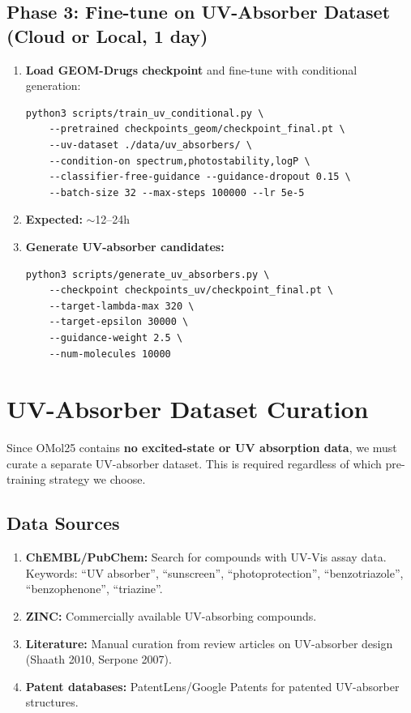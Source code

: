\documentclass[11pt,a4paper]{article}
\begin{document}
\subsection{Phase 3: Fine-tune on UV-Absorber Dataset (Cloud or Local, 1 day)}

\begin{enumerate}[nosep]
    \item \textbf{Load GEOM-Drugs checkpoint} and fine-tune with conditional generation:
\begin{verbatim}
python3 scripts/train_uv_conditional.py \
    --pretrained checkpoints_geom/checkpoint_final.pt \
    --uv-dataset ./data/uv_absorbers/ \
    --condition-on spectrum,photostability,logP \
    --classifier-free-guidance --guidance-dropout 0.15 \
    --batch-size 32 --max-steps 100000 --lr 5e-5
\end{verbatim}
    \item \textbf{Expected:} $\sim$12--24h
    \item \textbf{Generate UV-absorber candidates:}
\begin{verbatim}
python3 scripts/generate_uv_absorbers.py \
    --checkpoint checkpoints_uv/checkpoint_final.pt \
    --target-lambda-max 320 \
    --target-epsilon 30000 \
    --guidance-weight 2.5 \
    --num-molecules 10000
\end{verbatim}
\end{enumerate}

\section{UV-Absorber Dataset Curation}
\label{sec:uv-dataset}

Since OMol25 contains \textbf{no excited-state or UV absorption data}, we must
curate a separate UV-absorber dataset. This is required regardless of which
pre-training strategy we choose.

\subsection{Data Sources}

\begin{enumerate}[nosep]
    \item \textbf{ChEMBL/PubChem:} Search for compounds with UV-Vis assay data.
          Keywords: ``UV absorber'', ``sunscreen'', ``photoprotection'',
          ``benzotriazole'', ``benzophenone'', ``triazine''.
    \item \textbf{ZINC:} Commercially available UV-absorbing compounds.
    \item \textbf{Literature:} Manual curation from review articles on
          UV-absorber design (Shaath 2010, Serpone 2007).
    \item \textbf{Patent databases:} PatentLens/Google Patents for patented
          UV-absorber structures.
\end{enumerate}
\end{document}
